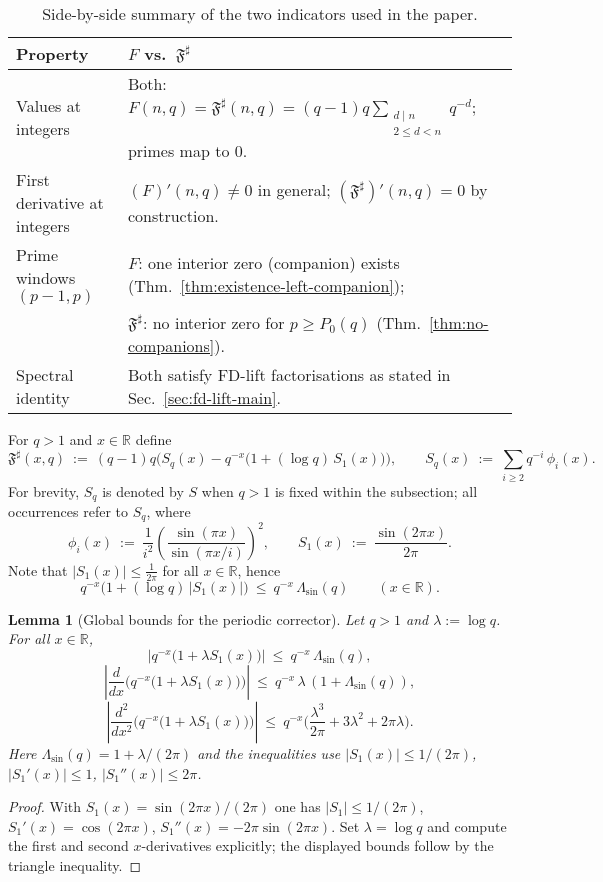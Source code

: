 \documentclass[11pt,a4paper]{amsart}
\newcommand{\F}{F}
\newcommand{\Fbase}{\mathfrak F}
\newcommand{\Fsharp}{\Fbase^{\sharp}}
\theoremstyle{plain}
\newtheorem{lemma}[theorem]{Lemma}
\theoremstyle{definition}
\theoremstyle{remark}
\begin{document}
\begin{table}[h]
\small
\centering
\begin{tabular}{ll}
\hline
Property & $\F$ vs.\ $\Fsharp$ \\
\hline
Values at integers & Both: $\F(n,q)=\Fsharp(n,q)= (q-1)q\sum_{\substack{d\mid n\\2\le d<n}} q^{-d}$; primes map to $0$. \\
First derivative at integers & $(\F)'(n,q)\neq 0$ in general; $(\Fsharp)'(n,q)=0$ by construction. \\
Prime windows $(p-1,p)$ & $\F$: one interior zero (companion) exists (Thm.~\ref{thm:existence-left-companion}); \\
& $\Fsharp$: no interior zero for $p\ge P_0(q)$ (Thm.~\ref{thm:no-companions}). \\
Spectral identity & Both satisfy FD-lift factorisations as stated in Sec.~\ref{sec:fd-lift-main}. \\
\hline
\end{tabular}
\caption{Side-by-side summary of the two indicators used in the paper.}
\label{tab:F-vs-Fsharp}
\end{table}


For $q>1$ and $x\in\mathbb R$ define
\[
\Fsharp(x,q)\ :=\ (q-1)q\Big(S_q(x)-q^{-x}\bigl(1+(\log q)\,S_1(x)\bigr)\Big),
\qquad
S_q(x)\ :=\ \sum_{i\ge2} q^{-i}\,\phi_i(x).
\]
For brevity, $S_q$ is denoted by $S$ when $q>1$ is fixed within the subsection; all occurrences refer to $S_q$, where
\[
\phi_i(x)\ :=\ \frac{1}{i^2}\left(\frac{\sin(\pi x)}{\sin(\pi x/i)}\right)^2,
\qquad
S_1(x)\ :=\ \frac{\sin(2\pi x)}{2\pi}.
\]
Note that $|S_1(x)|\le \tfrac{1}{2\pi}$ for all $x\in\mathbb R$, hence
\begin{equation}\label{eq:corrector-upper-bound}
q^{-x}\bigl(1+(\log q)\,|S_1(x)|\bigr)\ \le\ q^{-x}\,\Lambda_{\sin}(q)\qquad(x\in\mathbb R).
\end{equation}

\begin{lemma}[Global bounds for the periodic corrector]\label{lem:corrector-deriv-bounds}
Let $q>1$ and $\lambda:=\log q$. For all $x\in\mathbb R$,
\[
\big|q^{-x}\big(1+\lambda S_1(x)\big)\big|\ \le\ q^{-x}\,\Lambda_{\sin}(q),
\]
\[
\left|\frac{d}{dx}\Big(q^{-x}\big(1+\lambda S_1(x)\big)\Big)\right|\ \le\ q^{-x}\,\lambda\,(1+\Lambda_{\sin}(q)),
\]
\[
\left|\frac{d^2}{dx^2}\Big(q^{-x}\big(1+\lambda S_1(x)\big)\Big)\right|\ \le\ q^{-x}\Big(\frac{\lambda^{3}}{2\pi}+3\lambda^{2}+2\pi\lambda\Big).
\]
Here $\Lambda_{\sin}(q)=1+\lambda/(2\pi)$ and the inequalities use $|S_1(x)|\le 1/(2\pi)$, $|S_1'(x)|\le 1$, $|S_1''(x)|\le 2\pi$.
\end{lemma}
\begin{proof}
With $S_1(x)=\sin(2\pi x)/(2\pi)$ one has $|S_1|\le 1/(2\pi)$, $S_1'(x)=\cos(2\pi x)$, $S_1''(x)=-2\pi\sin(2\pi x)$.
Set $\lambda=\log q$ and compute the first and second $x$-derivatives explicitly; the displayed bounds follow by the triangle inequality.
\end{proof}
\end{document}
